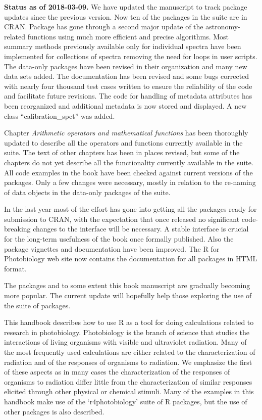 \begin{shaded}
\noindent
\textbf{Status as of 2018-03-09.} We have updated the manuscript to track package updates since the previous version. Now ten of the packages in the suite are in CRAN. Package  has gone through a second major update of the astronomy-related functions using much more efficient and precise algorithms. Most summary methods previously available only for individual spectra have been implemented for collections of spectra removing the need for loops in user scripts. The data-only packages have been revised in their organization and many new data sets added. The documentation has been revised and some bugs corrected with nearly four thousand test cases written to ensure the reliability of the code and facilitate future revisions. The code for handling of metadata attributes has been reorganized and additional metadata is now stored and displayed. A new class ``calibration\_spct'' was added.

Chapter \emph{Arithmetic operators and mathematical functions} has been thoroughly updated to describe all the operators and functions currently available in the suite. The text of other chapters has been in places revised, but some of the chapters do not yet describe all the functionality currently available in the suite. All code examples in the book have been checked against current versions of the packages. Only a few changes were necessary, mostly in relation to the re-naming of data objects in the data-only packages of the suite.

In the last year most of the effort has gone into getting all the packages ready for submission to CRAN, with the expectation that once released no significant code-breaking changes to the interface will be necessary. A stable interface is crucial for the long-term usefulness of the book once formally published. Also the package vignettes and documentation have been improved. The R for Photobiology web site now contains the documentation for all packages in HTML format.

The packages and to some extent this book manuscript are gradually becoming more popular. The current update will hopefully help those exploring the use of the suite of packages.
\end{shaded}

This handbook describes how to use R as a tool for doing calculations related to research in photobiology. Photobiology is the branch of science that studies the interactions of living organisms with visible and ultraviolet radiation. Many of the most frequently used calculations are either related to the characterization of radiation and of the responses of organisms to radiation. We emphasize the first of these aspects as in many cases the characterization of the responses of organisms to radiation differ little from the characterization of similar responses elicited through other physical or chemical stimuli.
Many of the examples in this handbook make use of the `r4photobiology'  suite of R packages, but the use of other packages is also described.

